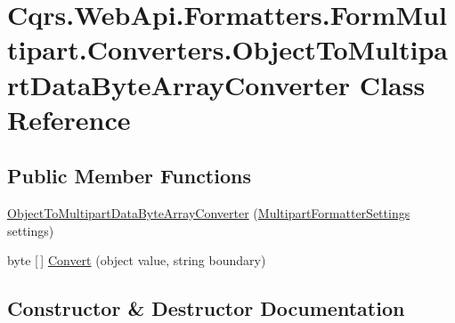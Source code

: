 \hypertarget{classCqrs_1_1WebApi_1_1Formatters_1_1FormMultipart_1_1Converters_1_1ObjectToMultipartDataByteArrayConverter}{}\section{Cqrs.\+Web\+Api.\+Formatters.\+Form\+Multipart.\+Converters.\+Object\+To\+Multipart\+Data\+Byte\+Array\+Converter Class Reference}
\label{classCqrs_1_1WebApi_1_1Formatters_1_1FormMultipart_1_1Converters_1_1ObjectToMultipartDataByteArrayConverter}
\subsection*{Public Member Functions}
\begin{DoxyCompactItemize}
\item 
\hyperlink{classCqrs_1_1WebApi_1_1Formatters_1_1FormMultipart_1_1Converters_1_1ObjectToMultipartDataByteArrayConverter_a1e647950d2959aa53e54a17ba86df058_a1e647950d2959aa53e54a17ba86df058}{Object\+To\+Multipart\+Data\+Byte\+Array\+Converter} (\hyperlink{classCqrs_1_1WebApi_1_1Formatters_1_1FormMultipart_1_1Infrastructure_1_1MultipartFormatterSettings}{Multipart\+Formatter\+Settings} settings)
\item 
byte \mbox{[}$\,$\mbox{]} \hyperlink{classCqrs_1_1WebApi_1_1Formatters_1_1FormMultipart_1_1Converters_1_1ObjectToMultipartDataByteArrayConverter_af7bd8ac108a7e95f5961a14064595f84_af7bd8ac108a7e95f5961a14064595f84}{Convert} (object value, string boundary)
\end{DoxyCompactItemize}


\subsection{Constructor \& Destructor Documentation}
\mbox{\label{classCqrs_1_1WebApi_1_1Formatters_1_1FormMultipart_1_1Converters_1_1ObjectToMultipartDataByteArrayConverter_a1e647950d2959aa53e54a17ba86df058_a1e647950d2959aa53e54a17ba86df058}} 
